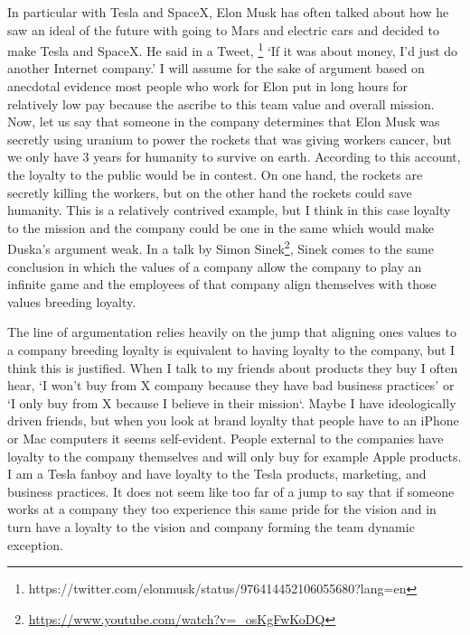 \documentclass[12pt]{article}
\begin{document}
In particular with Tesla and SpaceX, Elon Musk has often talked about how he
saw an ideal of the future with going to Mars and electric cars and decided to
make Tesla and SpaceX. He said in a Tweet,
\footnote{https://twitter.com/elonmusk/status/976414452106055680?lang=en} `If it
was about money, I’d just do another Internet company.' I will assume for the
sake of argument based on anecdotal evidence most people who work for Elon put
in long hours for relatively low pay because the ascribe to this team value and
overall mission. Now, let us say that someone in the company determines that
Elon Musk was secretly using uranium to power the rockets that was giving
workers cancer, but we only have 3 years for humanity to survive on earth.
According to this account, the loyalty to the public would be in contest. On one
hand, the rockets are secretly killing the workers, but on the other hand the
rockets could save humanity. This is a relatively contrived example, but I think
in this case loyalty to the mission and the company could be one in the same
which would make Duska's argument weak. In a talk by Simon
Sinek\footnote{\url{https://www.youtube.com/watch?v=_osKgFwKoDQ}}, Sinek comes
to the same conclusion in which the values of a company allow the company to
play an infinite game and the employees of that company align themselves with
those values breeding loyalty.

The line of argumentation relies heavily on the jump that aligning ones values
to a company breeding loyalty is equivalent to having loyalty to the company,
but I think this is justified. When I talk to my friends about products they
buy I often hear, `I won't buy from X company because they have bad business
practices' or `I only buy from X because I believe in their mission`. Maybe I
have ideologically driven friends, but when you look at brand loyalty that
people have to an iPhone or Mac computers it seems self-evident. People external
to the companies have loyalty to the company themselves and will only buy for
example Apple products. I am a Tesla fanboy and have loyalty to the Tesla
products, marketing, and business practices. It does not seem like too far of a
jump to say that if someone works at a company they too experience this same
pride for the vision and in turn have a loyalty to the vision and company
forming the team dynamic exception.
\end{document}
